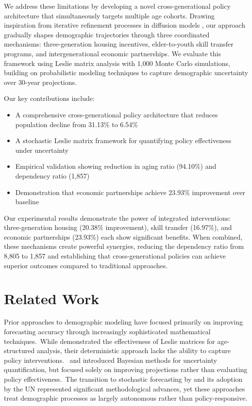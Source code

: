 \documentclass{article} %
\begin{document}
We address these limitations by developing a novel cross-generational policy architecture that simultaneously targets multiple age cohorts. Drawing inspiration from iterative refinement processes in diffusion models \citep{yang2023diffusion, Sohl-Dickstein2015DeepUL}, our approach gradually shapes demographic trajectories through three coordinated mechanisms: three-generation housing incentives, elder-to-youth skill transfer programs, and intergenerational economic partnerships. We evaluate this framework using Leslie matrix analysis with 1,000 Monte Carlo simulations, building on probabilistic modeling techniques \citep{vae} to capture demographic uncertainty over 30-year projections.

Our key contributions include:
\begin{itemize}
    \item A comprehensive cross-generational policy architecture that reduces population decline from 31.13\% to 6.54\%
    \item A stochastic Leslie matrix framework for quantifying policy effectiveness under uncertainty
    \item Empirical validation showing reduction in aging ratio (94.10\%) and dependency ratio (1,857)
    \item Demonstration that economic partnerships achieve 23.93\% improvement over baseline
\end{itemize}

Our experimental results demonstrate the power of integrated interventions: three-generation housing (20.38\% improvement), skill transfer (16.97\%), and economic partnerships (23.93\%) each show significant benefits. When combined, these mechanisms create powerful synergies, reducing the dependency ratio from 8,805 to 1,857 and establishing that cross-generational policies can achieve superior outcomes compared to traditional approaches.

\section{Related Work}
\label{sec:related}


Prior approaches to demographic modeling have focused primarily on improving forecasting accuracy through increasingly sophisticated mathematical techniques.\ While \citet{Malafeyev2024ModelingAD} demonstrated the effectiveness of Leslie matrices for age-structured analysis, their deterministic approach lacks the ability to capture policy interventions.\ \citet{Elderd2015QuantifyingDU} and \citet{Wiśniowski2015BayesianPF} introduced Bayesian methods for uncertainty quantification, but focused solely on improving projections rather than evaluating policy effectiveness.\ The transition to stochastic forecasting by \citet{Lee1994StochasticPF} and its adoption by the UN \citep{Alkema2015TheUN, Alexander2024DevelopingAI} represented significant methodological advances, yet these approaches treat demographic processes as largely autonomous rather than policy-responsive.
\end{document}
